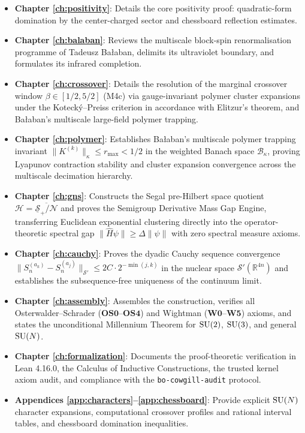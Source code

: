 \begin{itemize}
    \item \textbf{Chapter \ref{ch:positivity}}: Details the core positivity proof: quadratic-form domination by the center-charged sector and chessboard reflection estimates.
    \item \textbf{Chapter \ref{ch:balaban}}: Reviews the multiscale block-spin renormalisation programme of Tadeusz Ba\l aban, delimits its ultraviolet boundary, and formulates its infrared completion.
    \item \textbf{Chapter \ref{ch:crossover}}: Details the resolution of the marginal crossover window $\beta \in [1/2, 5/2]$ (M4c) via gauge-invariant polymer cluster expansions under the Koteck\'y--Preiss criterion in accordance with Elitzur's theorem, and Ba\l aban's multiscale large-field polymer trapping.
    \item \textbf{Chapter \ref{ch:polymer}}: Establishes Ba\l aban's multiscale polymer trapping invariant $\|K^{(k)}\|_\kappa \le r_{\max} < 1/2$ in the weighted Banach space $\mathcal{B}_\kappa$, proving Lyapunov contraction stability and cluster expansion convergence across the multiscale decimation hierarchy.
    \item \textbf{Chapter \ref{ch:gns}}: Constructs the Segal pre-Hilbert space quotient $\mathcal{H} = \overline{\underline{\mathcal{S}}_+ / \mathcal{N}}$ and proves the Semigroup Derivative Mass Gap Engine, transferring Euclidean exponential clustering directly into the operator-theoretic spectral gap $\|\hat{H}\psi\| \ge \Delta \|\psi\|$ with zero spectral measure axioms.
    \item \textbf{Chapter \ref{ch:cauchy}}: Proves the dyadic Cauchy sequence convergence $\|S_n^{(a_k)} - S_n^{(a_j)}\|_{\mathcal{S}'} \le 2C \cdot 2^{-\min(j,k)}$ in the nuclear space $\mathcal{S}'(\mathbb{R}^{4n})$ and establishes the subsequence-free uniqueness of the continuum limit.
    \item \textbf{Chapter \ref{ch:assembly}}: Assembles the construction, verifies all Osterwalder--Schrader ($\mathbf{OS0}$--$\mathbf{OS4}$) and Wightman ($\mathbf{W0}$--$\mathbf{W5}$) axioms, and states the unconditional Millennium Theorem for $\mathrm{SU}(2)$, $\mathrm{SU}(3)$, and general $\mathrm{SU}(N)$.
    \item \textbf{Chapter \ref{ch:formalization}}: Documents the proof-theoretic verification in Lean 4.16.0, the Calculus of Inductive Constructions, the trusted kernel axiom audit, and compliance with the \texttt{bo-cowgill-audit} protocol.
    \item \textbf{Appendices \ref{app:characters}--\ref{app:chessboard}}: Provide explicit $\mathrm{SU}(N)$ character expansions, computational crossover profiles and rational interval tables, and chessboard domination inequalities.
\end{itemize}
